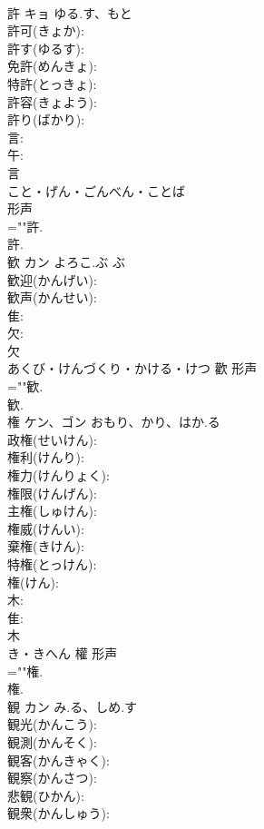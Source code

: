 \documentclass[8pt]{extreport}
\begin{document}
\begin{CJK}{UTF8}{min}
\\	許	キョ	ゆる.す、もと		
\\	許可(きょか): 
\\	許す(ゆるす): 
\\	免許(めんきょ): 
\\	特許(とっきょ): 
\\	許容(きょよう): 
\\	許り(ばかり): 
\\	言: 
\\	午: 
\\	言	
\\	こと・げん・ごんべん・ことば	
\\	形声 
\\	=""許.
\\	許.
\\	歓	カン	よろこ.ぶ	ぶ	
\\	歓迎(かんげい): 
\\	歓声(かんせい): 
\\	隹: 
\\	欠: 
\\	欠	
\\	あくび・けんづくり・かける・けつ	歡	形声 
\\	=""歓.
\\	歓.
\\	権	ケン、ゴン	おもり、かり、はか.る		
\\	政権(せいけん): 
\\	権利(けんり): 
\\	権力(けんりょく): 
\\	権限(けんげん): 
\\	主権(しゅけん): 
\\	権威(けんい): 
\\	棄権(きけん): 
\\	特権(とっけん): 
\\	権(けん): 
\\	木: 
\\	隹: 
\\	木	
\\	き・きへん	權	形声 
\\	=""権.
\\	権.
\\	観	カン	み.る、しめ.す		
\\	観光(かんこう): 
\\	観測(かんそく): 
\\	観客(かんきゃく): 
\\	観察(かんさつ): 
\\	悲観(ひかん): 
\\	観衆(かんしゅう): 

\end{CJK}
\end{document}
